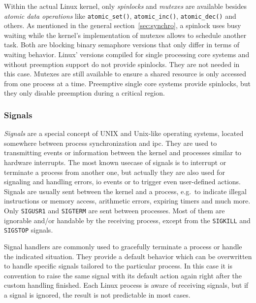 Within the actual Linux kernel, only \textit{spinlocks} and \textit{mutexes} are available besides \textit{atomic data operations} like \texttt{atomic\_set()}, \texttt{atomic\_inc()}, \texttt{atomic\_dec()} and others\cite{achilles2006betriebssysteme}.
As mentioned in the general section~\ref{sec:synchro}, a spinlock uses busy waiting while the kernel's implementation of mutexes allows to schedule another task.
Both are blocking binary semaphore versions that only differ in terms of waiting behavior\cite{linux-locking}.
Linux' versions compiled for single processing core systems and without preemption support do not provide spinlocks.
They are not needed in this case.
Mutexes are still available to ensure a shared resource is only accessed from one process at a time.
Preemptive single core systems provide spinlocks, but they only disable preemption during a critical region\cite{linux-locking}.

\subsubsection*{Signals}
\textit{Signals} are a special concept of UNIX and Unix-like operating systems, located somewhere between process synchronization and \ac{ipc}.
They are used to transmitting events or information between the kernel and processes similar to hardware interrupts\cite{glatz2015betriebssysteme}.
The most known usecase of signals is to interrupt or terminate a process from another one, but actually they are also used for signaling and handling errors, \ac{io} events or to trigger even user-defined actions\cite{achilles2006betriebssysteme}.
Signals are usually sent between the kernel and a process, e.g.\ to indicate illegal instructions or memory access, arithmetic errors, expiring timers and much more.
Only \texttt{SIGUSR1} and \texttt{SIGTERM} are sent between processes.
Most of them are ignorable and/or handable by the receiving process, except from the \texttt{SIGKILL} and \texttt{SIGSTOP} signals\cite{achilles2006betriebssysteme}.

Signal handlers are commonly used to gracefully terminate a process or handle the indicated situation.
They provide a default behavior which can be overwritten to handle specific signals tailored to the particular process.
In this case it is convention to raise the same signal with its default action again right after the custom handling finished\cite{achilles2006betriebssysteme}.
Each Linux process is aware of receiving signals, but if a signal is ignored, the result is not predictable in most cases. 

